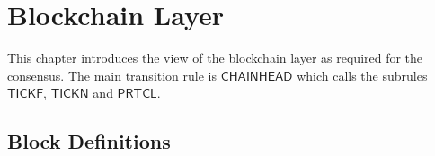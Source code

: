 \section{Blockchain Layer}
\label{sec:chain}

\newcommand{\BlocksMade}{\type{BlocksMade}}
\newcommand{\XOR}{\mathsf{XOR}}

This chapter introduces the view of the blockchain layer as required for the
consensus. The main transition rule is $\mathsf{CHAINHEAD}$ which calls the subrules
$\mathsf{TICKF}$, $\mathsf{TICKN}$ and $\mathsf{PRTCL}$.

\subsection{Block Definitions}
\label{sec:defs-blocks}

